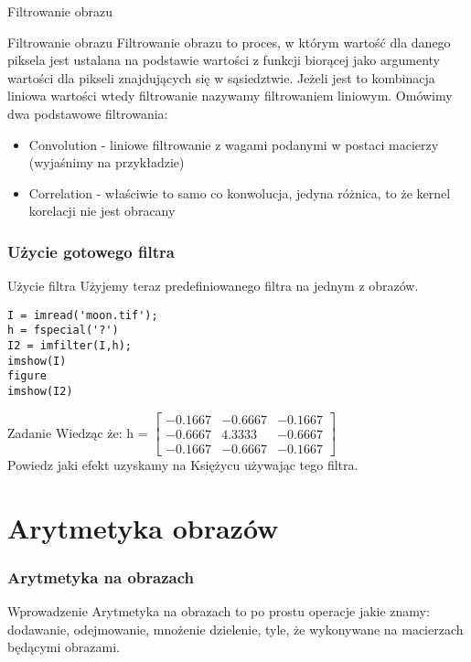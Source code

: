 \documentclass{beamer}
\begin{document}
\begin{frame}{Filtrowanie obrazu}
\begin{block}{Filtrowanie obrazu}
Filtrowanie obrazu to proces, w którym wartość dla danego piksela jest ustalana na podstawie wartości z funkcji biorącej jako argumenty wartości dla pikseli znajdujących się w sąsiedztwie. Jeżeli jest to kombinacja liniowa wartości wtedy filtrowanie nazywamy filtrowaniem liniowym.
Omówimy dwa podstawowe filtrowania:
\end{block}

\begin{itemize}
	\item Convolution - liniowe filtrowanie z wagami podanymi w postaci macierzy (wyjaśnimy na przykładzie)
	\item Correlation - właściwie to samo co konwolucja, jedyna różnica, to że kernel korelacji nie jest obracany
\end{itemize}

\end{frame}

\begin{frame}[fragile]
\frametitle{Użycie gotowego filtra}
\begin{block}{Użycie filtra}
Użyjemy teraz predefiniowanego filtra na jednym z obrazów.
\end{block}

\begin{example}
\begin{lstlisting}
I = imread('moon.tif');
h = fspecial('?')
I2 = imfilter(I,h);
imshow(I)
figure
imshow(I2)
\end{lstlisting}
\end{example}

\begin{alertblock}{Zadanie}
Wiedząc że: h = $\begin{bmatrix}
   -0.1667  & -0.6667 &  -0.1667\\
   -0.6667  &  4.3333 &  -0.6667\\
   -0.1667  & -0.6667 &  -0.1667
\end{bmatrix}$\\
Powiedz jaki efekt uzyskamy na Księżycu używając tego filtra.
\end{alertblock}

\end{frame}

\section{Arytmetyka obrazów}


\begin{frame}[fragile]
\frametitle{Arytmetyka na obrazach}
\begin{block}{Wprowadzenie}
Arytmetyka na obrazach to po prostu operacje jakie znamy: dodawanie, odejmowanie, mnożenie dzielenie, tyle, że wykonywane na macierzach będącymi obrazami.
\end{block}
\end{frame}
\end{document}
